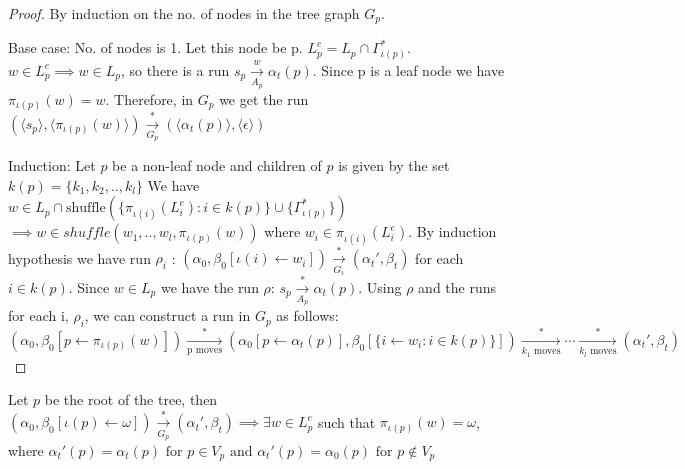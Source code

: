 \documentclass[a4paper,UKenglish,cleveref, autoref, thm-restate]{lipics-v2019}
\begin{document}
\begin{proof} By induction on the no. of nodes in the tree graph $G_p$.

Base case: No. of nodes is 1. Let this node be p. $L_p^e = L_p \cap \Gamma_{\iota(p)}^*$. $w \in L_p^e \implies w \in L_p$, so there is a run  $s_p \xrightarrow[A_p]{w} \alpha_t(p)$. Since p is a leaf node we have $\pi_{\iota(p)}(w) = w$. Therefore, in $G_p$ we get the run $(\langle s_p \rangle , \langle \pi_{\iota(p)}(w) \rangle ) \xrightarrow[G_p]{*} (\langle \alpha_t(p) \rangle , \langle \epsilon \rangle )$

Induction: Let $p$ be a non-leaf node and children of $p$ is given by the set $k(p) = \{k_1, k_2, .., k_l\}$  We have $w \in  L_p \cap \text{shuffle}(\{ \pi_{\iota(i)}(L_i^e)  : i \in k(p)\} \cup \{\Gamma_{\iota(p)}^*\})$
$\implies w \in shuffle(w_1,.., w_l,\pi_{\iota(p)}(w) )$ where $w_i \in \pi_{\iota(i)}(L_i^e)$. 
By induction hypothesis we have run $\rho_i$ : $(\alpha_0, \beta_0[\iota(i) \leftarrow w_i]) \xrightarrow[G_i]{*} (\alpha_t', \beta_t)$ for each $i \in k(p)$. 
Since $w \in L_p$ we have the run $\rho$:  $s_p \xrightarrow[A_p]{*} \alpha_t(p)$. 
Using $\rho$ and the runs for each i, $\rho_i$, we can construct a run in $G_p$ as follows: 
$(\alpha_0, \beta_0[p \leftarrow \pi_{\iota(p)}(w)]) \xrightarrow[\text{p moves}]{*} (\alpha_0[p \leftarrow \alpha_t(p)], \beta_0[\{i \leftarrow w_i : i \in k(p)\}]) \xrightarrow[\text{$k_1$ moves}]{*} \cdots \xrightarrow[\text{$k_l$ moves}]{*} (\alpha_t', \beta_t) $
\end{proof}
    


   
\begin{lemma}\label{testenv-lemma}

Let $p$ be the root of the tree, then \\
\hspace*{2cm}$(\alpha_0, \beta_0[\iota(p) \leftarrow \omega]) \xrightarrow[G_p]{*} (\alpha_t', \beta_t) \implies \exists w \in L_p^e $ such that $\pi_{\iota(p)}(w) = \omega$, \\
where $\alpha_t'(p) = \alpha_t(p) \text{ for } p \in V_p  \text{ and } \alpha_t'(p) = \alpha_0(p) \text{ for } p \notin V_p$


\end{lemma}
   
\end{document}
